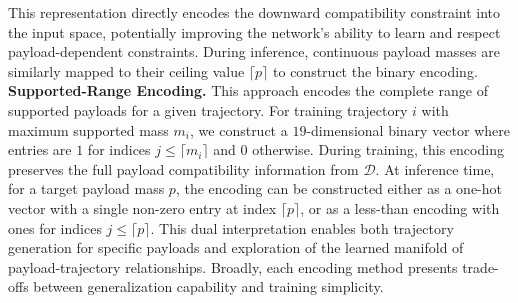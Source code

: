 This representation directly encodes the downward compatibility constraint into the input space, potentially improving the network's ability to learn and respect payload-dependent constraints.
During inference, continuous payload masses are similarly mapped to their ceiling value $\lceil p \rceil$ to construct the binary encoding.
\noindent\textbf{Supported-Range Encoding.}
This approach encodes the complete range of supported payloads for a given trajectory.
For training trajectory $i$ with maximum supported mass $m_i$, we construct a $19$-dimensional binary vector where entries are $1$ for indices $j \leq \lceil m_i \rceil$ and $0$ otherwise.
During training, this encoding preserves the full payload compatibility information from $\mathcal{D}$.
At inference time, for a target payload mass $p$, the encoding can be constructed either as a one-hot vector with a single non-zero entry at index $\lceil p \rceil$, or as a less-than encoding with ones for indices $j \leq \lceil p \rceil$.
This dual interpretation enables both trajectory generation for specific payloads and exploration of the learned manifold of payload-trajectory relationships.
Broadly, each encoding method presents trade-offs between generalization capability and training simplicity.